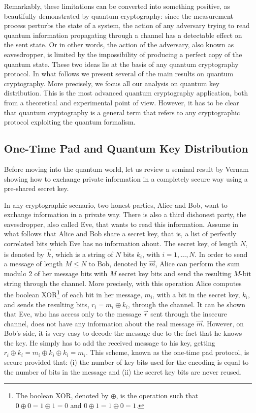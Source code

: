 \documentclass[a4paper]{article}
\begin{document}
Remarkably, these limitations can be converted into something
positive, as beautifully demonstrated by quantum cryptography:
since the measurement process perturbs the state of a system, the
action of any adversary trying to read quantum information propagating
through a channel has a detectable effect on the sent
state. Or in other words, the action of the adversary, also known as
eavesdropper, is limited by the impossibility of producing a
perfect copy of the quantum state. These two ideas lie at the
basis of any quantum cryptography protocol. In what follows we
present several of the main results on quantum cryptography. More
precisely, we focus all our analysis on quantum key distribution.
This is the most advanced quantum cryptography application, both
from a theoretical and experimental point of view. However, it has
to be clear that quantum cryptography is a general term that
refers to any cryptographic protocol exploiting the quantum formalism.

\subsection{One-Time Pad and Quantum Key Distribution}

Before moving into the quantum world, let us review a seminal
result by Vernam showing how to exchange private information in a
completely secure way using a pre-shared secret key.

In any cryptographic scenario, two honest parties, Alice and Bob,
want to exchange information in a private way. There is also a
third dishonest party, the eavesdropper, also called Eve, that
wants to read this information. Assume in what follows that Alice
and Bob share a secret key, that is, a list of perfectly
correlated bits which Eve has no information about. The secret
key, of length $N$, is denoted by $\vec k$, which is a string of
$N$ bits $k_i$, with $i=1,\ldots,N$. In order to send a message of
length $M\leq N$ to Bob, denoted by $\vec m$, Alice can perform
the sum modulo 2 of her message bits with $M$ secret key bits and
send the resulting $M$-bit string through the channel. More
precisely, with this operation Alice computes the boolean
XOR\footnote{The boolean XOR, denoted by $\oplus$, is the
operation such that $0\oplus 0=1\oplus 1=0$ and $0\oplus 1=1\oplus
0=1$.} of each bit in her message, $m_i$, with a bit in the secret
key, $k_i$, and sends the resulting bits, $r_i=m_i\oplus k_i$,
through the channel. It can be shown that Eve, who has access only to
the message $\vec r$ sent through the insecure channel, does not
have any information about the real message $\vec m$. However, on
Bob's side, it is very easy to decode the message due to the fact
that he knows the key. He simply has to add the received message
to his key, getting $r_i\oplus k_i=m_i\oplus k_i\oplus k_i=m_i$.
This scheme, known as the one-time pad
protocol, is secure provided that: (i) the number of key bits used
for the encoding is equal to the number of bits in the message and
(ii) the secret key bits are never reused.
\end{document}
